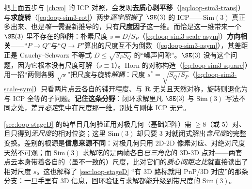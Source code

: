 \begin{insight}\label{ins:loop-sim3-asym}
把上面五步与 \cref{ch:vo} 的 ICP 对照，会发现\textbf{去质心剥平移}（\cref{eq:loop-sim3-trans}）与\textbf{求旋转}（\cref{eq:loop-sim3-rot}）两步\emph{逐字照搬}了 $\SE(3)$ 的 ICP——$\mathrm{Sim}(3)$ 真正多出来、也是\emph{唯一}需要新推导的，只有\textbf{尺度因子}这一维。而恰是这一维带来一个 $\SE(3)$ 里不存在的陷阱：朴素尺度 $s=D/S_P$（\cref{eq:loop-sim3-scale-asym}）\textbf{方向相关}——“$P\!\to\!Q$”与“$Q\!\to\!P$”算出的尺度互不为倒数（\cref{eq:loop-sim3-asym}），其差距正是 Cauchy--Schwarz 不等式 $D\le\sqrt{S_PS_Q}$ 的“噪声间隙”。$\SE(3)$ 没有这个问题，因为它根本没有尺度可解（$s\equiv 1$）。Horn 的对称构造（\cref{eq:loop-sim3-square}）用一招“两侧各劈 $\sqrt s$”把尺度与旋转\emph{解耦}：尺度 $s^\ast=\sqrt{S_Q/S_P}$（\cref{eq:loop-sim3-scale-sym}）只看两片点云各自的铺开程度、与 $\mathbf R$ 无关且天然对称，旋转则退化为与 ICP 全等的子问题。\textbf{记住这条分野}：闭环求解里凡 $\SE(3)$ 与 $\mathrm{Sim}(3)$ 写法不同之处，差异\emph{必定}集中在尺度那一维，别处与刚体 ICP 无异。
\end{insight}

\begin{insight}\label{ins:loop-sim3-3pt}
\cref{sec:loop-stageD} 的纯单目几何验证用对极几何（基础矩阵）需 $\ge 8$（或 $5$）对、且只得到\emph{无尺度}的相对位姿；这里 $\mathrm{Sim}(3)$ 却只要 $3$ 对就闭式解出\emph{含尺度}的完整变换。差别的根源是\textbf{信息来源不同}：对极几何只用 $2$D-$2$D 像素对应、对绝对尺度天然不可观；而 $\mathrm{Sim}(3)$ 求解吃的是两帧各自\emph{已三角化}的 $3$D-$3$D 点对——两套点云本身带着各自的（虽不一致的）尺度，比对它们的\emph{质心间距之比}就直接读出了相对尺度 $s$\cite{horn1987closed}。这也解释了 \cref{sec:loop-stageD} “有 $3$D 路标就用 PnP/$3$D 对应”的那条分支：一旦手里有 $3$D 信息，回环验证与求解都能升级到带尺度的 $\mathrm{Sim}(3)$。
\end{insight}


